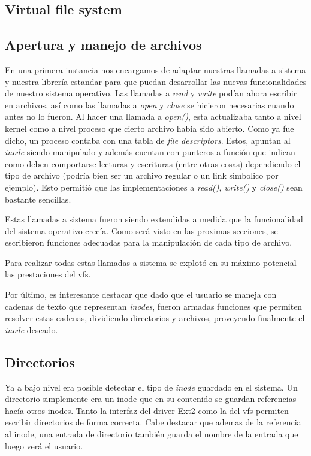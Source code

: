 \documentclass[a4paper,10pt]{article}
\begin{document}
        \subsection{Virtual file system}
    
    \subsection{Apertura y manejo de archivos}
    En una primera instancia nos encargamos de adaptar nuestras llamadas a sistema y nuestra librería estandar
    para que puedan desarrollar las nuevas funcionalidades de nuestro sistema operativo. Las llamadas a \textit{read} y
    \textit{write} podían ahora escribir en archivos, así como las llamadas a \textit{open} y \textit{close} se hicieron
    necesarias cuando antes no lo fueron.
    Al hacer una llamada a \textit{open()}, esta actualizaba tanto a nivel kernel como a nivel proceso que cierto
    archivo habia sido abierto. Como ya fue dicho, un proceso contaba con una tabla de \textit{file descriptors}. 
    Estos, apuntan al \textit{inode} siendo manipulado y además cuentan con punteros a función que indican como 
    deben comportarse lecturas y escrituras (entre otras cosas) dependiendo el tipo de archivo 
    (podría bien ser un archivo regular o un link simbolico por ejemplo). Esto permitió que las implementaciones 
    a \textit{read()}, \textit{write()} y \textit{close()} sean bastante sencillas. 
    
    Estas llamadas a sistema fueron siendo extendidas a medida que la funcionalidad del sistema operativo crecía. Como
    será visto en las proximas secciones, se escribieron funciones adecuadas para la manipulación de cada tipo de archivo.
    
    Para realizar todas estas llamadas a sistema se explotó en su máximo potencial las prestaciones del vfs.
    
    Por último, es interesante destacar que dado que el usuario se maneja con cadenas de texto que representan 
    \textit{inodes}, fueron armadas funciones que permiten resolver estas cadenas, dividiendo directorios y archivos,
    proveyendo finalmente el \textit{inode} deseado. 

    \subsection{Directorios}
    
    Ya a bajo nivel era posible detectar el tipo de \textit{inode} guardado en el sistema. Un directorio simplemente era
    un inode que en su contenido se guardan referencias hacía otros inodes. Tanto la interfaz del driver Ext2 como la del
    vfs permiten escribir directorios de forma correcta. Cabe destacar que ademas de la referencia al inode, una entrada
    de directorio también guarda el nombre de la entrada que luego verá el usuario.
\end{document}
